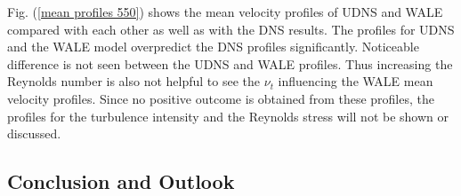 %
Fig. (\ref{mean profiles 550}) shows the mean velocity profiles of UDNS and WALE compared with each other as well as with the DNS results. The profiles for UDNS and the WALE model overpredict the DNS profiles significantly. Noticeable difference is not seen between the UDNS and WALE profiles. Thus increasing the Reynolds number is also not helpful to see the $\nu_t$ influencing the WALE mean velocity profiles. Since no positive outcome is obtained from these profiles, the profiles for the turbulence intensity and the Reynolds stress will not be shown or discussed.

\subsection{Conclusion and Outlook}
